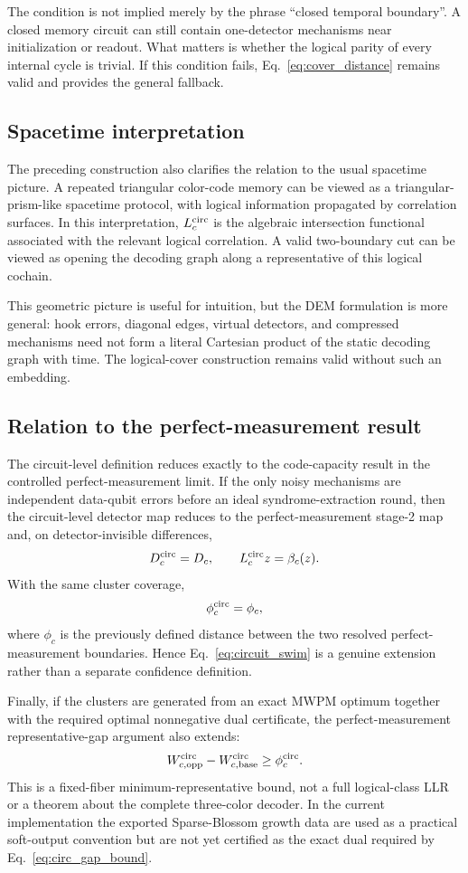 \documentclass[10pt,twocolumn]{article}
\begin{document}
The condition is not implied merely by the phrase ``closed temporal
boundary''.  A closed memory circuit can still contain one-detector
mechanisms near initialization or readout.  What matters is whether the
logical parity of every internal cycle is trivial.  If this condition fails,
Eq.~\eqref{eq:cover_distance} remains valid and provides the general fallback.

\subsection{Spacetime interpretation}

The preceding construction also clarifies the relation to the usual
spacetime picture.  A repeated triangular color-code memory can be viewed
as a triangular-prism-like spacetime protocol, with logical information
propagated by correlation surfaces.  In this interpretation,
\(L_c^{\rm circ}\) is the algebraic intersection functional associated with
the relevant logical correlation.  A valid two-boundary cut can be viewed
as opening the decoding graph along a representative of this logical
cochain.

This geometric picture is useful for intuition, but the DEM formulation is
more general: hook errors, diagonal edges, virtual detectors, and compressed
mechanisms need not form a literal Cartesian product of the static decoding
graph with time.  The logical-cover construction remains valid without such
an embedding.

\subsection{Relation to the perfect-measurement result}

The circuit-level definition reduces exactly to the code-capacity result in
the controlled perfect-measurement limit.  If the only noisy mechanisms are
independent data-qubit errors before an ideal syndrome-extraction round, then
the circuit-level detector map reduces to the perfect-measurement stage-2
map and, on detector-invisible differences,
\[
 D_c^{\rm circ}=D_c,\qquad
 L_c^{\rm circ}z=\beta_c(z).
\]
With the same cluster coverage,
\[
 \phi_c^{\rm circ}
 =
 \phi_c,
\]
where \(\phi_c\) is the previously defined distance between the two
resolved perfect-measurement boundaries.  Hence
Eq.~\eqref{eq:circuit_swim} is a genuine extension rather than a separate
confidence definition.

Finally, if the clusters are generated from an exact MWPM optimum together
with the required optimal nonnegative dual certificate, the perfect-measurement
representative-gap argument also extends:
\[
 W_{c,\mathrm{opp}}^{\rm circ}
 -
 W_{c,\mathrm{base}}^{\rm circ}
 \geq
 \phi_c^{\rm circ}.
 \label{eq:circ_gap_bound}
\]
This is a fixed-fiber minimum-representative bound, not a full logical-class
LLR or a theorem about the complete three-color decoder.  In the current
implementation the exported Sparse-Blossom growth data are used as a
practical soft-output convention but are not yet certified as the exact
dual required by Eq.~\eqref{eq:circ_gap_bound}.
\end{document}
